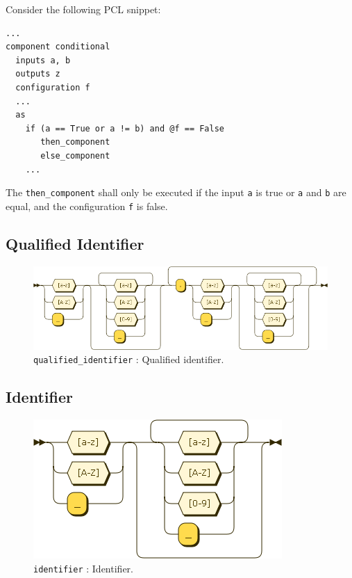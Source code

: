 Consider the following PCL snippet:
\begin{center}
  \begin{verbatim}
...
component conditional
  inputs a, b
  outputs z
  configuration f
  ...
  as
    if (a == True or a != b) and @f == False
       then_component
       else_component
    ...
  \end{verbatim}
\end{center}
The \texttt{then\_component} shall only be executed if the input \texttt{a} is true or \texttt{a} and \texttt{b} are equal, and the configuration \texttt{f} is false.

\subsection{Qualified Identifier}
\begin{figure}[!h]
  \centering
    \includegraphics[scale=\DiagramScale,angle=90]{chapters/compiler/diagrams/qualified_identifier}
  \caption{\texttt{qualified\_identifier} : Qualified identifier.}
  \label{fig:pcl-qualified-id}
\end{figure}

\subsection{Identifier}
\begin{figure}[!h]
  \centering
    \includegraphics[scale=\DiagramScale]{chapters/compiler/diagrams/identifier}
  \caption{\texttt{identifier} : Identifier.}
  \label{fig:pcl-id}
\end{figure}

